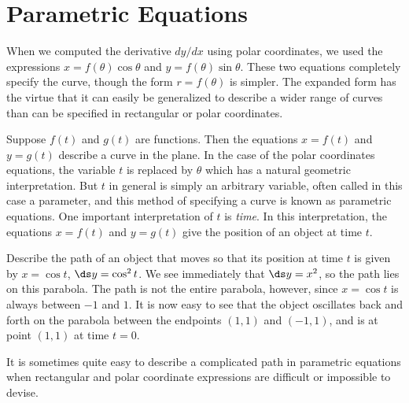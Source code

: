 \section{Parametric Equations}{}{}
\label{sec:parametric equations}
\nobreak
When we computed the derivative $dy/dx$ using polar coordinates, we
used the expressions $x=f(\theta)\cos\theta$ and
$y=f(\theta)\sin\theta$. These two equations completely specify the
curve, though the form $r=f(\theta)$ is simpler. The expanded form has
the virtue that it can easily be generalized to describe a wider range
of curves than can be specified in rectangular or polar coordinates. 

Suppose $f(t)$ and $g(t)$ are functions. Then the equations
$x=f(t)$ and $y=g(t)$ describe a curve in the plane. In the case of
the polar coordinates equations, the variable $t$ is replaced by
$\theta$ which has a natural geometric interpretation. But $t$ in
general is simply an arbitrary variable, often called in this case a
{\dfont parameter}, and this method of specifying a curve is known as 
{\dfont parametric equations}. One
important interpretation of $t$ is {\it time}. In this interpretation,
the equations $x=f(t)$ and $y=g(t)$ give the position of an object at
time $t$.

\begin{example} Describe the path of an object that moves so that its
position at time $t$ is given by $x=\cos t$, $\ds y=\cos^2 t$. We see
immediately that $\ds y=x^2$, so the path lies on this parabola. The path
is not the entire parabola, however, since $x=\cos t$ is always
between $-1$ and $1$. It is now easy to see that the object oscillates
back and forth on the parabola between the endpoints $(1,1)$ and
$(-1,1)$, and is at point $(1,1)$ at time $t=0$.
\end{example}

It is sometimes quite easy to describe a complicated path in
parametric equations when rectangular and polar coordinate expressions
are difficult or impossible to devise.

